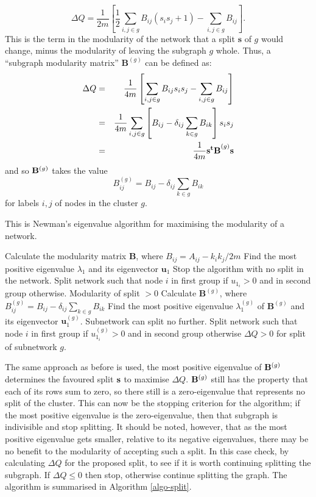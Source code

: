 \begin{equation}
\Delta Q  =  \frac{1}{2m} \left[ \frac{1}{2}\sum_{i,j\in g}B_{ij}(s_is_j + 1) - \sum_{i,j \in g} B_{ij} \right].
\end{equation}
This is the term in the modularity of the network that a split $\mathbf{s}$ of 
$g$ would change, minus the modularity of leaving the subgraph $g$ whole.  Thus, a ``subgraph modularity matrix'' $\mathbf{B}^{(g)}$ can be defined as:
\begin{eqnarray}
\Delta Q & = & \frac{1}{4m}\left[ \sum_{i,j \in g} B_{ij}s_is_j - \sum_{i,j \in g}B_{ij}\right] \cr
& = & \frac{1}{4m}\sum_{i,j \in g}\left[ B_{ij} - \delta_{ij}\sum_{k \in g} B_{ik}\right]s_is_j \cr
& = & \frac{1}{4m}{\bf s^tB}^{(g)}{\bf s}
\end{eqnarray}
and so ${\bf B}^{(g)}$ takes the value
\begin{equation}
B^{(g)}_{ij} = B_{ij} - \delta_{ij}\sum_{k \in g} B_{ik}
\end{equation}
for labels $i,j$ of nodes in the cluster $g$.

\begin{algorithm}
\caption{This is Newman's eigenvalue algorithm for maximising the modularity of a network.}
\label{algo-split}
\begin{algorithmic}
\STATE Calculate the modularity matrix $\mathbf{B}$, where $B_{ij} = A_{ij} - k_ik_j/2m$
\STATE Find the most positive eigenvalue $\lambda_1$ and its eigenvector $\mathbf{u}_1$
\STATE Stop the algorithm with no split in the network.
\ELSE
\STATE Split network such that node $i$ in first group if $u_{1_{i}} > 0$ and in second group otherwise.
\ENSURE Modularity of split $> 0$
\ENDIF
{}
\STATE Calculate $\mathbf{B}^{(g)}$, where $B^{(g)}_{ij} = B_{ij} - \delta_{ij}\sum_{k\in g}B_{ik}$
\STATE Find the most positive eigenvalue $\lambda^{(g)}_1$ of $\mathbf{B}^{(g)}$ and its eigenvector $\mathbf{u}^{(g)}_1$.
\STATE Subnetwork can split no further.
\ELSE
\STATE Split network such that node $i$ in first group if $u^{(g)}_{1_{i}} > 0$ and in second group otherwise
\ENSURE $\Delta Q > 0$ for split of subnetwork $g$.
\ENDIF
\ENDFOR
\end{algorithmic}
\end{algorithm}

The same approach as before is used, the most
positive eigenvalue of ${\bf B}^{(g)}$ determines the favoured split
${\bf s}$ to maximise $\Delta Q$. ${\bf B}^{(g)}$ still has the
property that each of its rows sum to zero, so there still is a
zero-eigenvalue that represents no split of the cluster.  This can
now be the stopping criterion for the algorithm; if the most positive eigenvalue is the
zero-eigenvalue, then that subgraph is indivisible and stop
splitting.  It should be noted, however, that as the most
positive eigenvalue gets smaller, relative to its negative
eigenvalues, there may be no benefit to the modularity of accepting
such a split.  In this case  check, by calculating $\Delta Q$ for
the proposed split, to see if it is worth continuing splitting the subgraph.
If $\Delta Q \leq 0$ then stop, otherwise continue
splitting the graph.  The algorithm is summarised in Algorithm \ref{algo-split}.  

